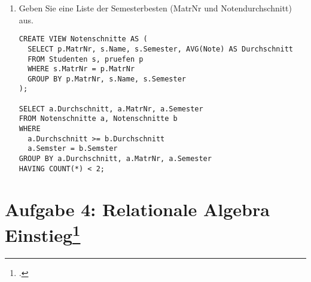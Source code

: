 \documentclass{lehramt-informatik-haupt}
\begin{document}
\begin{enumerate}
\begin{antwort}[muster]
\begin{verbatim}
SELECT DISTINCT h1.Name, h2.MatrNr, h1.Semester
FROM hoertKant h1, hoertKant h2
WHERE h1.MatrNr = h2.MatrNr AND h1.VorlNr <> h2.VorlNr;
\end{verbatim}

oder:

\begin{verbatim}
SELECT DISTINCT Name, MatrNr, Semester
FROM hoertKant
GROUP BY Name, MatrNr, Semester
HAVING COUNT(VorlNr) > 1;
\end{verbatim}

\subsection*{In einer Abfrage}

\begin{verbatim}
SELECT s.Name, s.MatrNr, s.Semester
FROM Studenten s, hoeren h, Vorlesungen v, Professoren p
WHERE
  s.MatrNr = h.MatrNr AND
  h.VorlNr = v.VorlNr AND
  v.gelesenVon = p.PersNr AND
  p.Name = 'Kant'
GROUP BY s.MatrNr, s.Name, s.Semster
HAVING COUNT(s.MatrNr) > 1;
\end{verbatim}
\end{antwort}


\item Geben Sie eine Liste der Semesterbesten (MatrNr und
Notendurchschnitt) aus.

\begin{antwort}[muster]
\begin{verbatim}
CREATE VIEW Notenschnitte AS (
  SELECT p.MatrNr, s.Name, s.Semester, AVG(Note) AS Durchschnitt
  FROM Studenten s, pruefen p
  WHERE s.MatrNr = p.MatrNr
  GROUP BY p.MatrNr, s.Name, s.Semester
);

SELECT a.Durchschnitt, a.MatrNr, a.Semester
FROM Notenschnitte a, Notenschnitte b
WHERE
  a.Durchschnitt >= b.Durchschnitt
  a.Semster = b.Semster
GROUP BY a.Durchschnitt, a.MatrNr, a.Semester
HAVING COUNT(*) < 2;
\end{verbatim}
\end{antwort}

\end{enumerate}

%

\section{Aufgabe 4: Relationale Algebra Einstieg\footcite{db:pu:2}}
\end{document}
